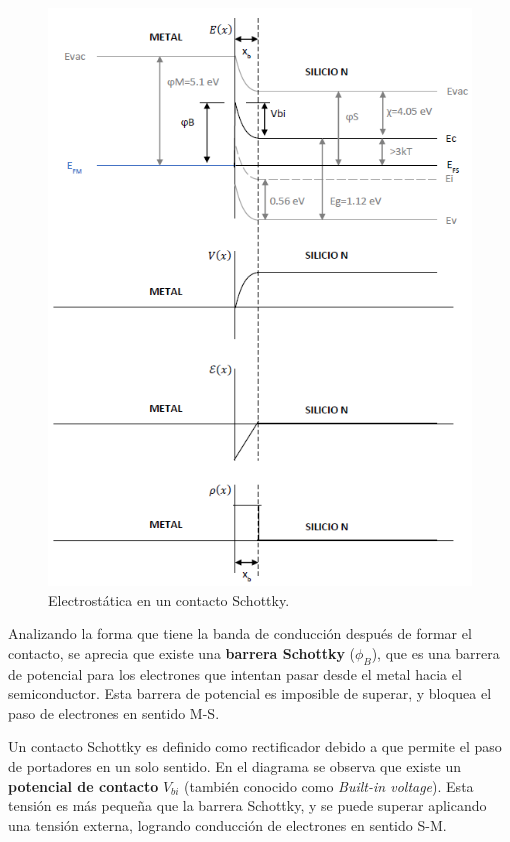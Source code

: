 \begin{figure}[H]
    \centering
    \includegraphics{figuras/contacto_schottky_3.png}
    \caption{Electrostática en un contacto Schottky.}
    \label{schottky1c}
\end{figure}

Analizando la forma que tiene la banda de conducción después de formar el contacto, se aprecia que existe una \textbf{barrera Schottky} ($\phi_B$), que es una barrera de potencial para los electrones que intentan pasar desde el metal hacia el semiconductor. Esta barrera de potencial es imposible de superar, y bloquea el paso de electrones en sentido M-S.

Un contacto Schottky es definido como rectificador debido a que permite el paso de portadores en un solo sentido. En el diagrama se observa que existe un \textbf{potencial de contacto} $V_{bi}$ (también conocido como \textit{Built-in voltage}). Esta tensión es más pequeña que la barrera Schottky, y se puede superar aplicando una tensión externa, logrando conducción de electrones en sentido S-M.

